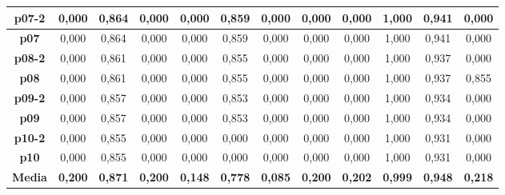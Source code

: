 \documentclass{article}
\begin{document}
\begin{landscape}
\begin{table}[]
\begin{tabular}{|c|c|c|c|c|c|c|c|c|c|c|c|}
    \textbf{p07-2}  &  0,000  &  0,864  &  0,000  &  0,000  &  0,859  &  0,000  &  0,000  &  0,000  &  1,000  &  0,941  &  0,000 \\ \hline
    \textbf{p07}    &  0,000  &  0,864  &  0,000  &  0,000  &  0,859  &  0,000  &  0,000  &  0,000  &  1,000  &  0,941  &  0,000 \\ \hline
    \textbf{p08-2}  &  0,000  &  0,861  &  0,000  &  0,000  &  0,855  &  0,000  &  0,000  &  0,000  &  1,000  &  0,937  &  0,000 \\ \hline
    \textbf{p08}    &  0,000  &  0,861  &  0,000  &  0,000  &  0,855  &  0,000  &  0,000  &  0,000  &  1,000  &  0,937  &  0,855 \\ \hline
    \textbf{p09-2}  &  0,000  &  0,857  &  0,000  &  0,000  &  0,853  &  0,000  &  0,000  &  0,000  &  1,000  &  0,934  &  0,000 \\ \hline
    \textbf{p09}    &  0,000  &  0,857  &  0,000  &  0,000  &  0,853  &  0,000  &  0,000  &  0,000  &  1,000  &  0,934  &  0,000 \\ \hline
    \textbf{p10-2}  &  0,000  &  0,855  &  0,000  &  0,000  &  0,000  &  0,000  &  0,000  &  0,000  &  1,000  &  0,931  &  0,000 \\ \hline
    \textbf{p10}    &  0,000  &  0,855  &  0,000  &  0,000  &  0,000  &  0,000  &  0,000  &  0,000  &  1,000  &  0,931  &  0,000 \\ \hline
    \textbf{Media}  &  \textbf{0,200}  &  \textbf{0,871}  &  \textbf{0,200}  &  \textbf{0,148}  &  \textbf{0,778}  &  \textbf{0,085}  &  \textbf{0,200}  &  \textbf{0,202}  &  \textbf{0,999}  &  \textbf{0,948}  &  \textbf{0,218} \\ \hline
    \end{tabular}
    \end{table}
    \end{landscape}
    
\end{document}
